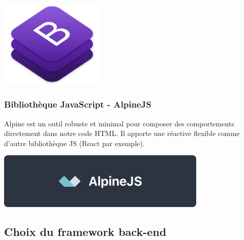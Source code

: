 				\begin{center}
					\includegraphics[width=5cm]{chap_2/bootstrap.png}
					\label{figure7}
					\cite{logo_bootstrap}
				\end{center}
			
			\subsubsection{Bibliothèque  JavaScript - AlpineJS}
			
			Alpine est un outil robuste et minimal pour composer des comportements directement dans notre code HTML. Il apporte une réactive flexible comme d'autre bibliothèque JS (React par exemple).\\
		
			\begin{center}
				\includegraphics[width=10cm]{chap_2/alpine.png}
				\label{figure8}
				\cite{logo_alpine}
			\end{center}
				
		\subsection{Choix du framework back-end}
